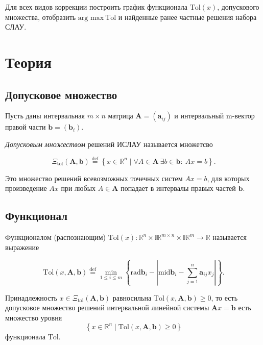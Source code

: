 \documentclass[a4paper,14pt]{article}
\begin{document}
  Для всех видов коррекции построить график функционала
  \( \text{Tol} (x) \), допускового множества, отобразить
  \( \text{arg max} \ \text{Tol} \) и найденные ранее частные решения набора
  СЛАУ.

  \section{Теория}

  \subsection{Допусковое множество}

  Пусть даны интервальная \( m \times n \) матрица \( \mathbf{A} = (\mathbf{a}_{ij}) \) и
  интервальный m-вектор правой части \( \mathbf{b}  = (\mathbf{b}_i)\).
  \vspace{\baselineskip}

  \emph{Допусковым множеством} решений ИСЛАУ называется множетсво

  \begin{equation} \label{eq:tol_set_of_solutions}
    \Xi_{\text{tol}} (\mathbf{A}, \mathbf{b}) \stackrel{\text{def}}{=}
      \left \{ x \in \mathbb{R}^n \mid \forall A \in \mathbf{A} \ \exists b \in \mathbf{b}: \ Ax = b \right \}.
  \end{equation}

  \vspace{\baselineskip}

  Это множество решений всевозможных точечных систем  \( Ax = b \), для которых произведение \(Ax\) при любых \(A \in \mathbf{A}\) попадает в интервалы правых частей \( \mathbf{b} \).

  \subsection{Функционал}

  Функционалом (распознающим) \( \text{Tol} (x): \mathbb{R}^n \times \mathbb{IR}^{m \times n} \times \mathbb{IR}^m \to \mathbb{R} \)
  называется выражение

  \begin{equation} \label{eq:tol}
    \text{Tol} (x, \mathbf{A}, \mathbf{b}) \stackrel{\text{def}}{=}
      \min_{1 \leq i \leq m} \left \{ \text{rad} \mathbf{b}_i - \left | \text{mid} \mathbf{b}_i - \sum_{j=1}^n \mathbf{a}_{ij} x_j \right | \right \}.
  \end{equation}

  Принадлежность \( x \in \Xi_{\text{tol}} (\mathbf{A}, \mathbf{b}) \)
  равносильна \( \text{Tol} (x, \mathbf{A}, \mathbf{b}) \geq 0 \), то есть
  допусковое множество решений интервальной линейной системы
  \( \mathbf{A} x = \mathbf{b} \) есть множество уровня
  \[
    \left \{ x \in \mathbb{R}^n \mid \text{Tol} (x, \mathbf{A}, \mathbf{b}) \geq 0 \right \}
  \]
  функционала \( \text{Tol} \).
\end{document}
